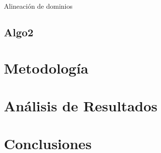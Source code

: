 \documentclass{beamer}
\begin{document}
\begin{frame}{Alineación de dominios}
\end{frame}

\subsection{Algo2}

\section{Metodología}
\section{Análisis de Resultados}
\section{Conclusiones}

\backmatter
\end{document}
